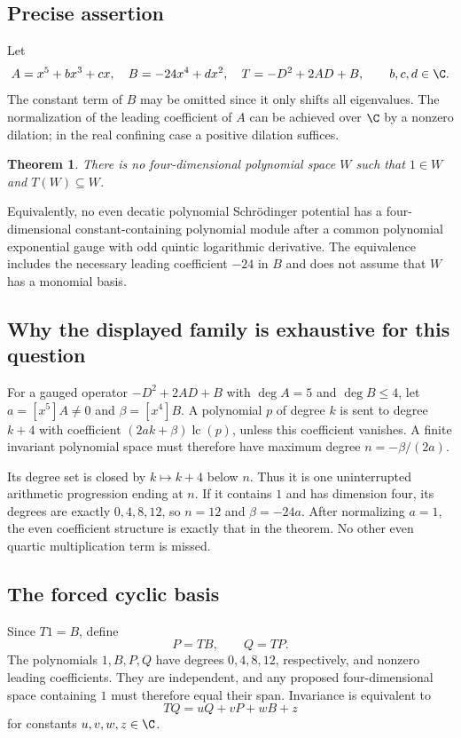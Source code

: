 \documentclass[11pt,a4paper]{article}
\newtheorem{theorem}{Theorem}[section]
\theoremstyle{definition}\newtheorem{definition}[theorem]{Definition}
\theoremstyle{remark}\newtheorem{remark}[theorem]{Remark}
\numberwithin{equation}{section}
\begin{document}
\subsection{Precise assertion}\label{H09-sec-1}
Let
\[A=x^5+bx^3+cx,\quad B=-24x^4+dx^2,\quad
T=-D^2+2AD+B,\qquad b,c,d\in\C.
\]
The constant term of $B$ may be omitted since it only shifts all eigenvalues. The normalization of the leading coefficient of $A$ can be achieved over $\C$ by a nonzero dilation; in the real confining case a positive dilation suffices.
\begin{theorem}\label{H09-no4}
There is no four-dimensional polynomial space $W$ such that $1\in W$ and $T(W)\subseteq W$.
\end{theorem}
Equivalently, no even decatic polynomial Schr\"odinger potential has a four-dimensional constant-containing polynomial module after a common polynomial exponential gauge with odd quintic logarithmic derivative. The equivalence includes the necessary leading coefficient $-24$ in $B$ and does not assume that $W$ has a monomial basis.
\subsection{Why the displayed family is exhaustive for this question}\label{H09-sec-2}
For a gauged operator $-D^2+2AD+B$ with $\deg A=5$ and $\deg B\le4$, let $a=[x^5]A\ne0$ and $\beta=[x^4]B$. A polynomial $p$ of degree $k$ is sent to degree $k+4$ with coefficient $(2ak+\beta)\operatorname{lc}(p)$, unless this coefficient vanishes. A finite invariant polynomial space must therefore have maximum degree $n=-\beta/(2a)$.

Its degree set is closed by $k\mapsto k+4$ below $n$. Thus it is one uninterrupted arithmetic progression ending at $n$. If it contains $1$ and has dimension four, its degrees are exactly $0,4,8,12$, so $n=12$ and $\beta=-24a$. After normalizing $a=1$, the even coefficient structure is exactly that in the theorem. No other even quartic multiplication term is missed.
\subsection{The forced cyclic basis}\label{H09-sec-3}
Since $T1=B$, define
\[P=TB,\qquad Q=TP.
\]
The polynomials $1,B,P,Q$ have degrees $0,4,8,12$, respectively, and nonzero leading coefficients. They are independent, and any proposed four-dimensional space containing $1$ must therefore equal their span. Invariance is equivalent to
\begin{equation}\label{H09-closure}TQ=uQ+vP+wB+z\end{equation}
for constants $u,v,w,z\in\C$.
\end{document}
